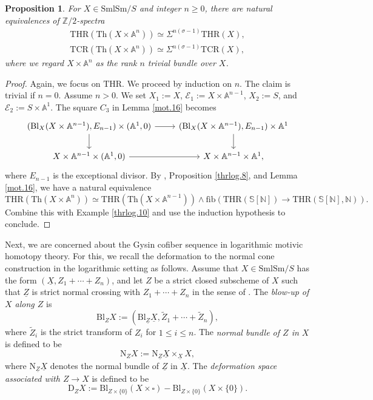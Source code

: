 \documentclass[10pt]{amsart}
\newtheorem{prop}[thm]{Proposition}
\theoremstyle{definition}
\theoremstyle{remark}
\numberwithin{equation}{section}
\newcommand{\A}{\mathbb{A}}
\newcommand{\N}{\mathbb{N}}
\newcommand{\Sphere}{\mathbb{S}}
\newcommand{\Z}{\mathbb{Z}}
\newcommand{\cE}{\mathcal{E}}
\newcommand{\ul}{\underline}
\newcommand{\fib}{\mathrm{fib}}
\newcommand{\SmlSm}{\mathrm{SmlSm}}
\newcommand{\Normal}{\mathrm{N}}
\newcommand{\Blow}{\mathrm{Bl}}
\newcommand{\Th}{\mathrm{Th}}
\newcommand{\Deform}{\mathrm{D}}
\newcommand{\THR}{\mathrm{THR}}
\newcommand{\TCR}{\mathrm{TCR}}
\begin{document}
\begin{prop}
\label{mot.17}
For $X\in \SmlSm/S$ and integer $n\geq 0$,
there are natural equivalences of $\Z/2$-spectra
\begin{gather*}
\THR(\Th(X\times \A^n))
\simeq
\Sigma^{n(\sigma-1)}\THR(X),
\\
\TCR(\Th(X\times \A^n))
\simeq
\Sigma^{n(\sigma-1)}\TCR(X),
\end{gather*}
where we regard $X\times \A^n$ as the rank $n$ trivial bundle over $X$.
\end{prop}
\begin{proof}
Again,
we focus on $\THR$.
We proceed by induction on $n$.
The claim is trivial if $n=0$.
Assume $n>0$.
We set $X_1:=X$,
$\cE_1:=X\times \A^{n-1}$,
$X_2:=S$,
and $\cE_2:=S\times \A^1$.
The square $C_3$ in Lemma \ref{mot.16} becomes
\[
\begin{tikzcd}
(\Blow_X(X\times \A^{n-1}),E_{n-1})\times (\A^1,0)\ar[r]\ar[d]&
(\Blow_X(X\times \A^{n-1}),E_{n-1})\times \A^1\ar[d]
\\
X\times \A^{n-1}\times (\A^1,0)\ar[r]&
X\times \A^{n-1}\times \A^1,
\end{tikzcd}
\]
where $E_{n-1}$ is the exceptional divisor.
By \cite[Proposition 5.2.4]{THR}, Proposition \ref{thrlog.8}, and Lemma \ref{mot.16},
we have a natural equivalence
\[
\THR(\Th(X\times \A^n))
\simeq
\THR(\Th(X\times \A^{n-1}))
\wedge
\fib(\THR(\Sphere[\N])\to \THR(\Sphere[\N],\N)).
\]
Combine this with Example \ref{thrlog.10} and use the induction hypothesis to conclude.
\end{proof}


Next, we are concerned about the Gysin cofiber sequence in logarithmic motivic homotopy theory.
For this,
we recall the deformation to the normal cone construction in the logarithmic setting as follows.
Assume that $X\in \SmlSm/S$ has the form $(\ul{X},Z_1+\cdots+Z_n)$,
and let $Z$ be a strict closed subscheme of $X$ such that $\ul{Z}$ is strict normal crossing with $Z_1+\cdots+Z_n$ in the sense of \cite[Definition 7.2.1]{logDM}.
The \emph{blow-up of $X$ along $Z$} is 
\[
\Blow_Z X:=(\Blow_{\ul{Z}}\ul{X},\widetilde{Z}_1+\cdots+\widetilde{Z}_n),
\]
where $\widetilde{Z}_i$ is the strict transform of $Z_i$ for $1\leq i\leq n$.
The \emph{normal bundle of $Z$ in $X$} is defined to be
\[
\Normal_Z X
:=
\Normal_{\ul{Z}} \ul{X} \times_{\ul{X}} X,
\]
where $\Normal_{\ul{Z}} \ul{X}$ denotes the normal bundle of $\ul{Z}$ in $\ul{X}$.
The \emph{deformation space associated with $Z\to X$} is defined to be
\[
\Deform_Z X
:=
\Blow_{Z\times \{0\}}(X\times \square)
-
\Blow_{Z\times \{0\}}(X\times \{0\}).
\]
\end{document}

